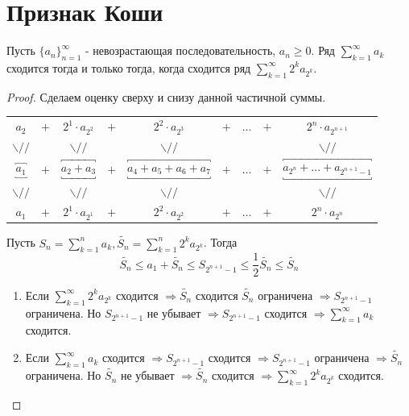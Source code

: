 	\section{Признак Коши}
	
	\begin{theorem}
		Пусть $\{a_n\}^{\infty}_{n = 1}$ - невозрастающая последовательность, $a_n \geqslant 0.$ Ряд $\sum^{\infty}_{k = 1} a_k$ сходится тогда и только тогда, когда сходится ряд $\sum^{\infty}_{k = 1} 2^k a_{2^k}.$
	\end{theorem}
	
	\begin{proof}
		Сделаем оценку сверху и снизу данной частичной суммы. \newline
		\begin{tabular}{ccccccccc}
			$a_2$ & $+$ & $2^1 \cdot a_{2^2}$ & $+$ & $2^2 \cdot a_{2^3}$ & $+$ & $\dots$ & $+$ & $2^n \cdot a_{2^{n + 1}}$ \\
	        $\backslash //$ &  & $\backslash //$ &  & $\backslash //$ &  &  &  &  $\backslash //$ \\
			$\overbracket{\underbracket{a_1}}$ & $+$ & $\overbracket{\underbracket{a_2 + a_3}}$ & $+$ & $\overbracket{\underbracket{a_4 + a_5 + a_6 + a_7}}$ & $+$ & $\dots$ & $+$ & $\overbracket{\underbracket{a_{2^n} + ... + a_{2^{n + 1} - 1}}}$ \\
			$\backslash //$ &  & $\backslash //$ &  & $\backslash //$ &  &  &  & $\backslash //$ \\
			$a_1$ & $+$ & $2^1 \cdot a_{2^1}$ & $+$ & $2^2 \cdot a_{2^2}$ & $+$ & $\dots$ & $+$ & $2^n \cdot a_{2^n}$ \\
		\end{tabular}
		
		Пусть $S_n = \sum^n_{k = 1} a_k, \tilde{S_n} = \sum^n_{k = 1} 2^k a_{2^k}$. Тогда
		\[ \tilde{S_n} \leqslant a_1 + \tilde{S_n} \leqslant S_{2^{n + 1} - 1} \leqslant \frac{1}{2}\tilde{S_n} \leqslant \tilde{S_n} \]
		\begin{enumerate}
			\item Если $\sum^{\infty}_{k = 1} 2^k a_{2^k}$ сходится $\Rightarrow \tilde{S_n}$ сходится $\tilde{S_n}$ ограничена $\Rightarrow S_{2^{n + 1} - 1}$ ограничена. Но $S_{2^{n + 1} - 1}$ не убывает $\Rightarrow S_{2^{n + 1} - 1}$ сходится $\Rightarrow \sum^{\infty}_{k = 1} a_k$ сходится.
			\item Если $\sum^{\infty}_{k = 1} a_k$ сходится $\Rightarrow S_{2^{n + 1} - 1}$ сходится $\Rightarrow S_{2^{n + 1} - 1}$ ограничена $\Rightarrow \tilde{S_n}$ ограничена. Но $\tilde{S_n}$ не убывает $\Rightarrow \tilde{S_n}$ сходится $\Rightarrow \sum^{\infty}_{k = 1} 2^k a_{2^k}$ сходится.
		\end{enumerate}
	\end{proof}
	
